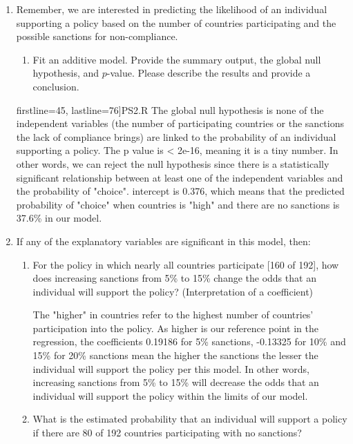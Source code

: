 \documentclass[12pt,letterpaper]{article}
\begin{document}
\begin{enumerate}
	\item
	Remember, we are interested in predicting the likelihood of an individual supporting a policy based on the number of countries participating and the possible sanctions for non-compliance.
	\begin{enumerate}
		\item [] Fit an additive model. Provide the summary output, the global null hypothesis, and $p$-value. Please describe the results and provide a conclusion.
	\end{enumerate}
	\vspace{1cm}
	 firstline=45, lastline=76]{PS2.R} 
	\begingroup
	\obeylines
	\endgroup
	\noindent The global null hypothesis is none of the independent variables (the number of participating countries or the sanctions the lack of compliance brings) are linked to the probability of an individual supporting a policy. The p value is  < 2e-16, meaning it is a tiny number. In other words, we can reject the null hypothesis since there is a statistically significant relationship between at least one of the independent variables and the probability of "choice". intercept is 0.376, which means that the predicted probability of "choice" when countries is "high" and there are no sanctions is 37.6\% in our model.
	\item
	If any of the explanatory variables are significant in this model, then:
	\begin{enumerate}
		\item
		For the policy in which nearly all countries participate [160 of 192], how does increasing sanctions from 5\% to 15\% change the odds that an individual will support the policy? (Interpretation of a coefficient)
		 
		\vspace{1cm}
		\noindent The "higher" in countries refer to the highest number of countries' participation into the policy. As higher is our reference point in the regression, the coefficients 0.19186 for 5\% sanctions, -0.13325 for 10\% and 15\% for 20\% sanctions mean the higher the sanctions the lesser the individual will support the policy per this model. In other words, increasing sanctions from 5\% to 15\% will decrease the odds that an individual will support the policy within the limits of our model.
		\item
		What is the estimated probability that an individual will support a policy if there are 80 of 192 countries participating with no sanctions? 
		\vspace{1cm}
		

\end{enumerate}
\end{enumerate}
\end{document}
